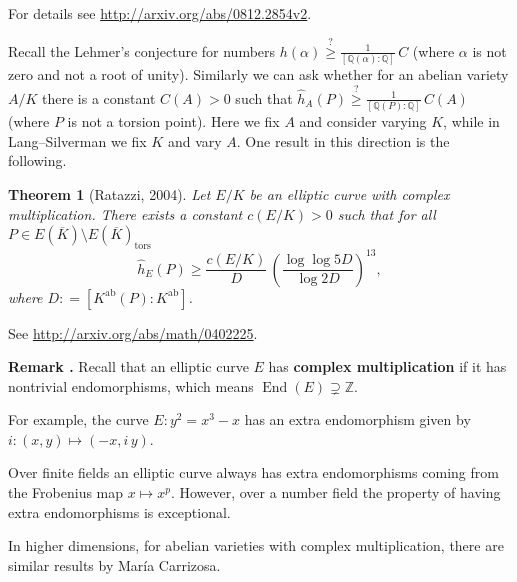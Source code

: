 \documentclass{article}
\newtheorem{theorem}[proposition]{Theorem}
\theoremstyle{definition}
\DeclareMathOperator{\End}{End}
\newcommand{\term}{\textbf}
\newcommand{\dfn}{\mathrel{\mathop:}=}
\newcommand{\ZZ}{\mathbb{Z}}
\newcommand{\QQ}{\mathbb{Q}}
\newenvironment{remark}
{ \begin{shaded}\begingroup\small\noindent\refstepcounter{proposition}\textbf{Remark \theproposition.} }
{ \endgroup\end{shaded} }
\begin{document}
For details see \url{http://arxiv.org/abs/0812.2854v2}.

\vspace{1em}

Recall the Lehmer's conjecture for numbers
$h (\alpha) \stackrel{?}{\ge} \frac{1}{[\QQ (\alpha) : \QQ]}\,C$ (where $\alpha$
is not zero and not a root of unity). Similarly we can ask whether for an
abelian variety $A/K$ there is a constant $C (A) > 0$ such that
$\widehat{h}_A (P) \stackrel{?}{\ge} \frac{1}{[\QQ (P) : \QQ]} \, C (A)$ (where
$P$ is not a torsion point). Here we fix $A$ and consider varying $K$, while in
Lang--Silverman we fix $K$ and vary $A$. One result in this direction is the
following.

\begin{theorem}[Ratazzi, 2004]
  Let $E/K$ be an elliptic curve with complex multiplication. There exists a
  constant $c (E/K) > 0$ such that for all
  $P \in E (\overline{K})\setminus E (\overline{K})_\mathrm{tors}$
  $$\widehat{h}_E (P) \ge \frac{c (E/K)}{D} \, \left(\frac{\log\log 5D}{\log 2D}\right)^{13},$$
  where $D \dfn [K^\mathrm{ab} (P) : K^\mathrm{ab}]$.
\end{theorem}

See \url{http://arxiv.org/abs/math/0402225}.

\begin{remark}
  Recall that an elliptic curve $E$ has \term{complex multiplication} if it has
  nontrivial endomorphisms, which means $\End (E) \supsetneq \ZZ$.

  For example, the curve $E\colon y^2 = x^3 - x$ has an extra endomorphism given
  by $i\colon (x,y)\mapsto (-x, i\,y)$.

  Over finite fields an elliptic curve always has extra endomorphisms coming
  from the Frobenius map $x\mapsto x^p$. However, over a number field the
  property of having extra endomorphisms is exceptional.
\end{remark}

In higher dimensions, for abelian varieties with complex multiplication, there
are similar results by Mar\'ia Carrizosa.
\end{document}
